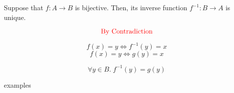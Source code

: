 %
%
%

\begin{frame}{}
  \begin{theorem}
    Suppose that $f: A \to B$ is bijective.
    Then, its inverse function $f^{-1}: B \to A$ is unique.
  \end{theorem}

  \pause
  \[
    \text{\textcolor{red}{By Contradiction}}
  \]

  \pause
  \[
    f(x) = y \iff f^{-1}(y) = x
  \]
  \[
    f(x) = y \iff g(y) = x
  \]

  \pause
  \[
    \forall y \in B.\; f^{-1}(y) = g(y)
  \]
\end{frame}

\begin{frame}{}
  examples
\end{frame}

